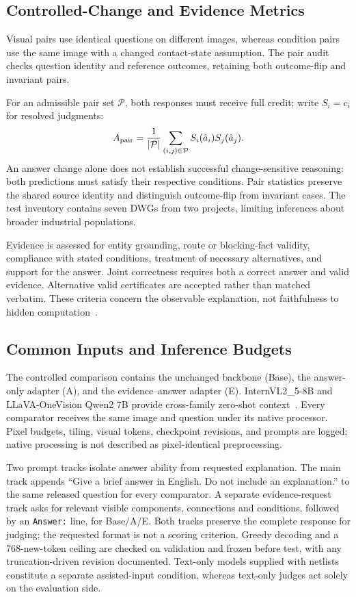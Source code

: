 \subsection{Controlled-Change and Evidence Metrics}
Visual pairs use identical questions on different images, whereas condition pairs use the same image with a changed contact-state assumption. The pair audit checks question identity and reference outcomes, retaining both outcome-flip and invariant pairs.

For an admissible pair set $\mathcal P$, both responses must receive full credit; write $S_i=c_i$ for resolved judgments:
\begin{equation}
A_{\rm pair}=\frac{1}{|\mathcal P|}\sum_{(i,j)\in\mathcal P}S_i(\hat a_i)S_j(\hat a_j).
\label{eq:pair}
\end{equation}
An answer change alone does not establish successful change-sensitive reasoning: both predictions must satisfy their respective conditions. Pair statistics preserve the shared source identity and distinguish outcome-flip from invariant cases. The test inventory contains seven DWGs from two projects, limiting inferences about broader industrial populations.

Evidence is assessed for entity grounding, route or blocking-fact validity, compliance with stated conditions, treatment of necessary alternatives, and support for the answer. Joint correctness requires both a correct answer and valid evidence. Alternative valid certificates are accepted rather than matched verbatim. These criteria concern the observable explanation, not faithfulness to hidden computation~\cite{deyoung2020eraser,turpin2023unfaithful}.

\subsection{Common Inputs and Inference Budgets}
The controlled comparison contains the unchanged backbone (Base), the answer-only adapter (A), and the evidence--answer adapter (E). InternVL2\_5-8B and LLaVA-OneVision Qwen2 7B provide cross-family zero-shot context~\cite{internvl25card,llavaonevisioncard,li2024onevision}. Every comparator receives the same image and question under its native processor. Pixel budgets, tiling, visual tokens, checkpoint revisions, and prompts are logged; native processing is not described as pixel-identical preprocessing.

Two prompt tracks isolate answer ability from requested explanation. The main track appends ``Give a brief answer in English. Do not include an explanation.'' to the same released question for every comparator. A separate evidence-request track asks for relevant visible components, connections and conditions, followed by an \texttt{Answer:} line, for Base/A/E. Both tracks preserve the complete response for judging; the requested format is not a scoring criterion. Greedy decoding and a 768-new-token ceiling are checked on validation and frozen before test, with any truncation-driven revision documented. Text-only models supplied with netlists constitute a separate assisted-input condition, whereas text-only judges act solely on the evaluation side.